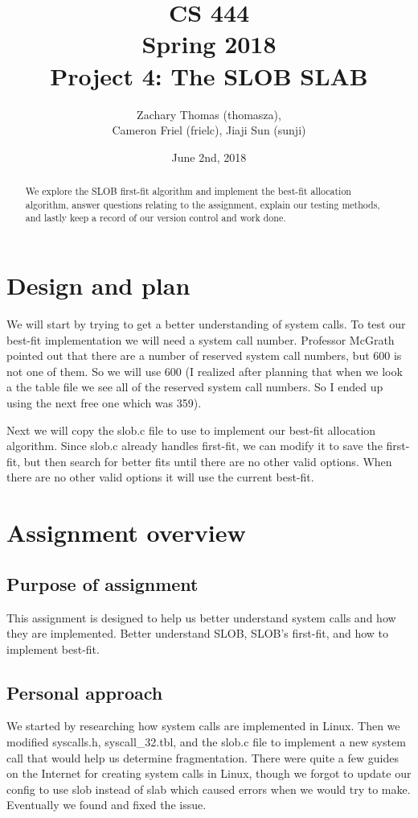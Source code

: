 \documentclass[journal,10pt,onecolumn,letterpaper,draftclsnofoot]{IEEEtran}
\title{CS 444 \\ Spring 2018  \\ Project 4: The SLOB SLAB}
\author{Zachary Thomas (thomasza),\\ Cameron Friel (frielc), Jiaji Sun (sunji)}
\date{June 2nd, 2018}
\begin{document}
\maketitle
\begin{abstract}
We explore the SLOB first-fit algorithm and implement the best-fit allocation algorithm, answer questions relating to the assignment, explain our testing methods, and lastly keep a record of our version control and work done.
\end{abstract}
    
\newpage
\tableofcontents
\newpage

\section{Design and plan}
We will start by trying to get a better understanding of system calls. To test our best-fit
implementation we will need a system call number. Professor McGrath pointed out that there
are a number of reserved system call numbers, but 600 is not one of them. So we will use 600
(I realized after planning that when we look a the table file we see all of the reserved system
call numbers. So I ended up using the next free one which was 359).

Next we will copy the slob.c file to use to implement our best-fit allocation algorithm.
Since slob.c already handles first-fit, we can modify it to save the first-fit, but then search
for better fits until there are no other valid options. When there are no other valid options
it will use the current best-fit.

\section{Assignment overview}

\subsection{Purpose of assignment}
This assignment is designed to help us better understand system calls and how they are implemented. Better understand SLOB, SLOB's first-fit, and how to implement best-fit.

\subsection{Personal approach}
We started by researching how system calls are implemented in Linux. Then we modified syscalls.h, syscall\_32.tbl, and the slob.c file to implement a new system call that would help us determine fragmentation. There were quite a few guides on the Internet for creating system calls in Linux, though we forgot to update our config to use slob instead of slab which caused errors when we would try to make. Eventually we found and fixed the issue.
\end{document}
